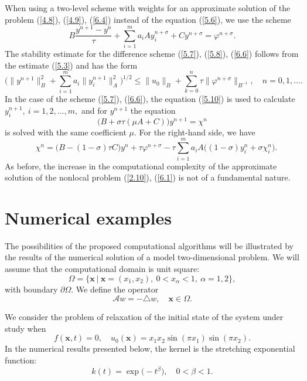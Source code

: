 \documentclass[3p]{elsarticle}
\numberwithin{equation}{section}
\begin{document}
When using a two-level scheme with weights for an approximate solution of the problem (\ref{4.8}), (\ref{4.9}), (\ref{6.4}) 
instead of the equation (\ref{5.6}), we use the scheme
\begin{equation}\label{6.6}
 B \frac{y^{n+1} - y^{n}}{\tau } + \sum_{i=1}^{m} a_i A y_i^{n+\sigma} + C y^{n+\sigma} = \varphi^{n+\sigma } .
\end{equation} 
The stability estimate for the difference scheme  (\ref{5.7}), (\ref{5.8}), (\ref{6.6}) follows from the estimate (\ref{5.3}) and has the form
\[
 \Big (\|y^{n+1}\|_B^2 + \sum_{i=1}^{m} a_i \|y_i^{n+1}\|_{A}^2 \Big)^{1/2} \leq \|u_0\|_B + \sum_{k=0}^{n}\tau \|\varphi^{n+\sigma }\|_{B^{-1}} ,
 \quad n = 0,1, \ldots .
\] 
In the case of the scheme (\ref{5.7}), (\ref{6.6}), the equation (\ref{5.10}) is used to calculate $y_i^{n+1}, \ i = 1,2,\ldots, m,$ 
and for $y^{n+1}$ the equation 
\[
 \big (B + \sigma \tau (\mu A + C) \big ) y^{n+1} = \chi^{n} 
\] 
is solved with the same coefficient $\mu$. 
For the right-hand side, we have
\[
 \quad \chi^{n} = \big (B - (1-\sigma) \tau C \big ) y^{n} + \tau \varphi^{n+\sigma } - 
 \tau \sum_{i=1}^{m} a_i A \big ( (1-\sigma) y_i^{n} + \sigma \chi_i^{n} \big ) .
\] 
As before, the increase in the computational complexity of the approximate solution of the nonlocal problem (\ref{2.10}), (\ref{6.1}) is not of a fundamental nature.

\section{Numerical examples }\label{sec:7} 

The possibilities of the proposed computational algorithms will be illustrated by the results of the numerical solution of a model two-dimensional problem.
We will assume that the computational domain is unit square:
\[
 \Omega = \{ \bm x  \ | \ \bm x = (x_1,x_2), \ 0 < x_\alpha  < 1 , \ \alpha  = 1,2 \} ,
\]
with boundary $\partial \Omega$.
We define the operator 
\[
 \mathcal{A} w = - \triangle w, 
 \quad \bm x \in \Omega .
\] 

We consider the problem of relaxation of the initial state of the system under study when
\[
 f(\bm x,t) = 0,
 \quad u_0(\bm x) = x_1 x_2 \sin(\pi x_1) \sin(\pi x_2) .
\] 
In the numerical results presented below, the kernel is the stretching exponential function:
\[
 k(t) = \exp\big(- t^{\beta} \big),
 \quad 0 < \beta  < 1 . 
\] 
\end{document}
